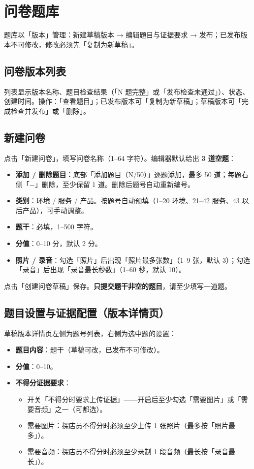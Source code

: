 \documentclass[12pt,a4paper,fontset=none]{ctexart}
\begin{document}
\section{问卷题库}

题库以「版本」管理：新建草稿版本 → 编辑题目与证据要求 → 发布；已发布版本不可修改，修改必须先「复制为新草稿」。

\subsection{问卷版本列表}
列表显示版本名称、题目检查结果（「N 题完整」或「发布检查未通过」）、状态、创建时间。操作：「查看题目」；已发布版本可「复制为新草稿」；草稿版本可「完成检查并发布」或「删除」。


\subsection{新建问卷}
点击「新建问卷」，填写问卷名称（1–64 字符）。编辑器默认给出 \textbf{3 道空题}：

\begin{itemize}
\item \textbf{添加 / 删除题目}：底部「添加题目（N/50）」逐题添加，最多 50 道；每题右侧「−」删除，至少保留 1 道。删除后题号自动重新编号。
\item \textbf{类别}：环境 / 服务 / 产品。按题号自动预填（1–20 环境、21–42 服务、43 以后产品），可手动调整。
\item \textbf{题干}：必填，1–500 字符。
\item \textbf{分值}：0–10 分，默认 2 分。
\item \textbf{照片 / 录音}：勾选「照片」后出现「照片最多张数」（1–9 张，默认 3）；勾选「录音」后出现「录音最长秒数」（1–60 秒，默认 10）。
\end{itemize}

点击「创建问卷草稿」保存。\textbf{只提交题干非空的题目}，请至少填写一道题。

\subsection{题目设置与证据配置（版本详情页）}
草稿版本详情页左侧为题号列表，右侧为选中题的设置：

\begin{itemize}
\item \textbf{题目内容}：题干（草稿可改，已发布不可修改）。
\item \textbf{分值}：0–10。
\item \textbf{不得分证据要求}：
  \begin{itemize}
  \item 开关「不得分时要求上传证据」——开启后至少勾选「需要图片」或「需要音频」之一（可都选）。
  \item 需要图片：探店员不得分时必须至少上传 1 张照片（最多按「照片最多」）。
  \item 需要音频：探店员不得分时必须至少录制 1 段音频（最长按「录音最长」）。
  \end{itemize}
\end{itemize}
\end{document}
